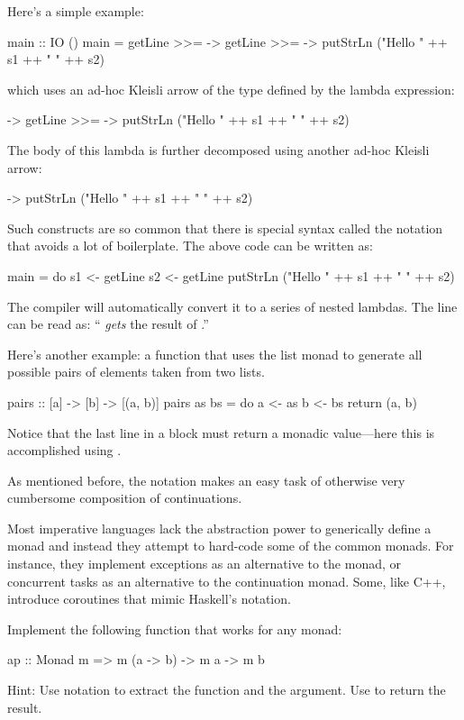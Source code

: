 \documentclass[DaoFP]{subfiles}
\begin{document}
Here's a simple example:
\begin{haskell}
main :: IO ()
main = 
  getLine >>=  ->
    getLine >>=  ->
      putStrLn ("Hello " ++ s1 ++ " " ++ s2)
\end{haskell}
which uses an ad-hoc Kleisli arrow of the type  defined by the lambda expression:
\begin{haskell}
 ->
    getLine >>=  ->
      putStrLn ("Hello " ++ s1 ++ " " ++ s2)
\end{haskell}
The body of this lambda is further decomposed using another ad-hoc Kleisli arrow:
\begin{haskell}
 -> putStrLn ("Hello " ++ s1 ++ " " ++ s2)
\end{haskell}

Such constructs are so common that there is special syntax called the  notation that avoids a lot of boilerplate. The above code can be written as:
\begin{haskell}
main = do
  s1 <- getLine
  s2 <- getLine
  putStrLn ("Hello " ++ s1 ++ " " ++ s2)
\end{haskell}
The compiler will automatically convert it to a series of nested lambdas. The line  can be read as: `` \emph{gets} the result of .''

Here's another example: a function that uses the list monad to generate all possible pairs of elements taken from two lists.
\begin{haskell}
pairs :: [a] -> [b] -> [(a, b)]
pairs as bs = do
  a <- as
  b <- bs
  return (a, b)
\end{haskell}
Notice that the last line in a  block must return a monadic value---here this is accomplished using .


As mentioned before, the  notation makes an easy task of otherwise very cumbersome composition of continuations.

Most imperative languages lack the abstraction power to generically define a monad and instead they attempt to hard-code some of the common monads. For instance, they implement exceptions as an alternative to the  monad, or concurrent tasks as an alternative to the continuation monad. Some, like C++, introduce coroutines that mimic Haskell's  notation. 

\begin{exercise}
Implement the following function that works for any monad:
\begin{haskell}
ap :: Monad m => m (a -> b) -> m a -> m b
\end{haskell}
Hint: Use  notation to extract the function and the argument. Use  to return the result.
\end{exercise}
\end{document}

